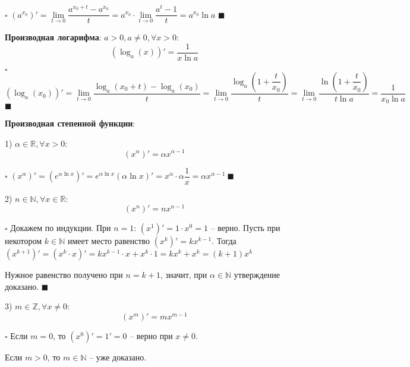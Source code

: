 \documentclass[12pt, a4paper, reqno]{article}
\begin{document}
    $\square$ $(a^{x_0})' = \lim\limits_{t\to 0}\dfrac{a^{x_0 + t} - a^{x_0}}{t} =
    a^{x_0}\cdot\lim\limits_{t\to 0}\dfrac{a^t - 1}{t} = a^{x_0}\ln{a}$ $\blacksquare$

    \textbf{Производная логарифма}: $a > 0, a\neq 0, \forall x > 0:$
    \begin{equation*}
        (\log_{a}(x))' = \dfrac{1}{x\ln{a}}
    \end{equation*}

    $\square$
    \begin{equation*}
        (\log_{a}(x_0))' =
        \lim\limits_{t\to 0}\dfrac{\log_{a}(x_0 + t) - \log_{a}(x_0)}{t} =
        \lim\limits_{t\to 0}\dfrac{\log_{a}\left(1 + \dfrac{t}{x_0}\right)}{t} =
        \lim\limits_{t\to 0}\dfrac{\ln\left(1 + \dfrac{t}{x_0}\right)}{t\ln{a}} =
        \dfrac{1}{x_0\ln{a}}
    \end{equation*}
    $\blacksquare$

    \textbf{Производная степенной функции}:

    1) $\alpha\in\mathbb{R}, \forall x > 0:$
    \begin{equation*}
        (x^{\alpha})' = \alpha x^{\alpha - 1}
    \end{equation*}

    $\square$ $(x^{\alpha})' = (e^{\alpha\ln{x}})' = e^{\alpha\ln{x}}(\alpha\ln{x})' =
    x^{\alpha}\cdot\alpha\dfrac{1}{x} = \alpha x^{\alpha - 1}\ \blacksquare$

    2) $n\in\mathbb{N}, \forall x\in\mathbb{R}:$
    \begin{equation*}
        (x^n)' = nx^{n - 1}
    \end{equation*}

    $\square$ Докажем по индукции. При $n = 1$: $(x^1)' = 1\cdot x^0 = 1$ -- верно. Пусть при
    некотором $k\in\mathbb{N}$ имеет место равенство $(x^k)' = kx^{k - 1}$. Тогда $(x^{k + 1})' =
    (x^k\cdot x)' =  kx^{k - 1}\cdot x + x^k\cdot 1 = kx^k + x^k = (k+1)x^k$

    Нужное равенство получено при $n = k + 1$, значит, при $\alpha\in\mathbb{N}$ утверждение
    доказано. $\blacksquare$

    3) $m\in\mathbb{Z}, \forall x\neq 0:$
    \begin{equation*}
        (x^m)' = mx^{m - 1}
    \end{equation*}

    $\square$ Если $m = 0$, то $(x^0)' = 1' = 0$ -- верно при $x\neq 0$.

    Если $m > 0$, то $m\in\mathbb{N}$ -- уже доказано.
\end{document}
